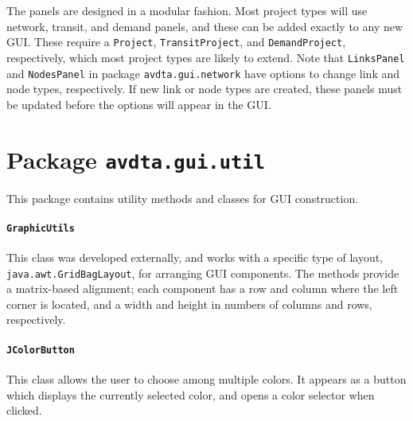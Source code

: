 The panels are designed in a modular fashion. Most project types will use network, transit, and demand panels, and these can be added exactly to any new GUI. These require a \texttt{Project}, \texttt{TransitProject}, and \texttt{DemandProject}, respectively, which most project types are likely to extend. Note that \texttt{LinksPanel} and \texttt{NodesPanel} in package \texttt{avdta.gui.network} have options to change link and node types, respectively. If new link or node types are created, these panels must be updated before the options will appear in the GUI.


























\section{Package \texttt{avdta.gui.util}}
\label{api:util}

This package contains utility methods and classes for GUI construction.

\paragraph*{\texttt{GraphicUtils}} This class was developed externally, and works with a specific type of layout, \texttt{java.awt.GridBagLayout}, for arranging GUI components. The methods provide a matrix-based alignment; each component has a row and column where the left corner is located, and a width and height in numbers of columns and rows, respectively.

\paragraph*{\texttt{JColorButton}}
This class allows the user to choose among multiple colors. It appears as a button which displays the currently selected color, and opens a color selector when clicked. 

